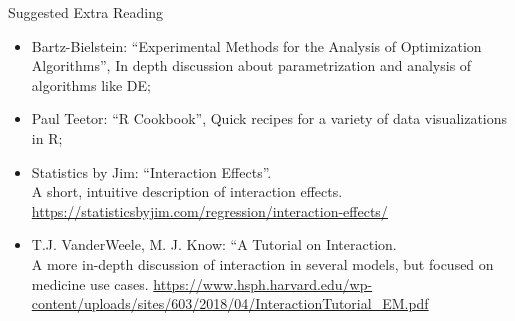 \begin{frame}{Suggested Extra Reading}{}
  \begin{itemize}
  \item Bartz-Bielstein: ``Experimental Methods for the Analysis of
    Optimization Algorithms'', In depth discussion about
    parametrization and analysis of algorithms like DE;\bigskip

  \item Paul Teetor: ``R Cookbook'', Quick recipes for a variety of
    data visualizations in R;\bigskip
    
  \item Statistics by Jim: ``Interaction Effects''.\\
    A short, intuitive description of interaction
    effects. \url{https://statisticsbyjim.com/regression/interaction-effects/}
    \bigskip
    
  \item T.J. VanderWeele, M. J. Know: ``A Tutorial on Interaction.\\
    A more in-depth discussion of interaction in several models, but focused on medicine use cases.
    \url{https://www.hsph.harvard.edu/wp-content/uploads/sites/603/2018/04/InteractionTutorial_EM.pdf}
  \end{itemize}
\end{frame}








